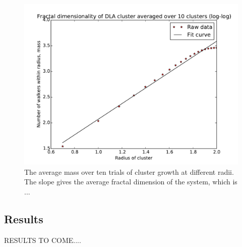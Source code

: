 \documentclass[a4paper,12pt]{article}
\begin{document}
\begin{figure}[htbp]
\begin{center}
\includegraphics[width = \textwidth]{pics/Fractal_dimension_final_avg.pdf}
\caption{The average mass over ten trials of cluster growth at different radii. The slope gives the average fractal dimension of the system, which is ...}
\label{AvgFractalDimension}
\end{center}
\end{figure}

\subsection{Results}  
\indent RESULTS TO COME....
\end{document}
